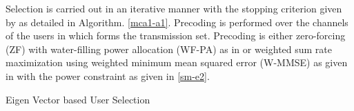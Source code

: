 Selection is carried out in an iterative manner with the stopping criterion given by  as detailed in Algorithm. \ref{mca1-a1}. Precoding is performed over the channels of the users in  which forms the transmission set. Precoding is either zero-forcing (ZF) with water-filling power allocation (WF-PA) as in \cite{tse2005fundamentals} or weighted sum rate maximization using weighted minimum mean squared error (W-MMSE) as given in \cite{wmmse_shi} with the power constraint as given in \eqref{sm-e2}.

\begin{algorithm}
 \SetAlgoLined
 \DontPrintSemicolon
 \caption{Eigen Vector based User Selection}
 \label{mca1-a1}
\end{algorithm}
